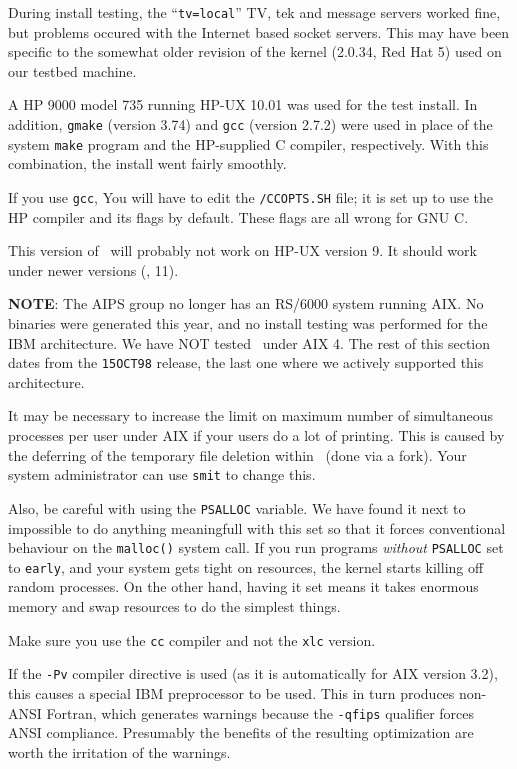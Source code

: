 During install testing, the ``{\tt tv=local}'' TV, tek and message
servers worked fine, but problems occured with the Internet based socket
servers.  This may have been specific to the somewhat older revision of
the kernel (2.0.34, Red Hat 5) used on our testbed machine.

\medskip{}

A HP 9000 model 735 running HP-UX 10.01 was used for the test install.
In addition, {\tt gmake} (version 3.74) and {\tt gcc} (version 2.7.2)
were used in place of the system {\tt make} program and the HP-supplied
C compiler, respectively.  With this combination, the install went
fairly smoothly.

If you use {\tt gcc}, You will have to edit the {\tt\SYSL /CCOPTS.SH}
file; it is set up to use the HP compiler and its flags by default.
These flags are all wrong for GNU C.

This version of \AIPS\ will probably not work on HP-UX version 9.  It
should work under newer versions (\eg, 11).

\medskip{}

{\bf NOTE}: The AIPS group no longer has an RS/6000 system running AIX.
No binaries were generated this year, and no install testing was
performed for the IBM architecture.  We have NOT tested \AIPS\ under AIX
4.  The rest of this section dates from the {\tt 15OCT98} release, the
last one where we actively supported this architecture.

It may be necessary to increase the limit on maximum number of
simultaneous processes per user under AIX if your users do a lot of
printing.  This is caused by the deferring of the temporary file
deletion within \AIPS\ (done via a fork).  Your system administrator can
use {\tt smit} to change this.

Also, be careful with using the {\tt PSALLOC} variable.  We have found
it next to impossible to do anything meaningfull with this set so that
it forces conventional behaviour on the {\tt malloc()} system call.  If
you run programs {\it without\/} {\tt PSALLOC} set to {\tt early}, and
your system gets tight on resources, the kernel starts killing off
random processes.  On the other hand, having it set means it takes
enormous memory and swap resources to do the simplest things.

Make sure you use the {\tt cc} compiler and not the {\tt xlc} version.

If the {\tt -Pv} compiler directive is used (as it is automatically for
AIX version 3.2), this causes a special IBM preprocessor to be used.
This in turn produces non-ANSI Fortran, which generates warnings because
the {\tt -qfips} qualifier forces ANSI compliance.  Presumably the
benefits of the resulting optimization are worth the irritation of the
warnings.

